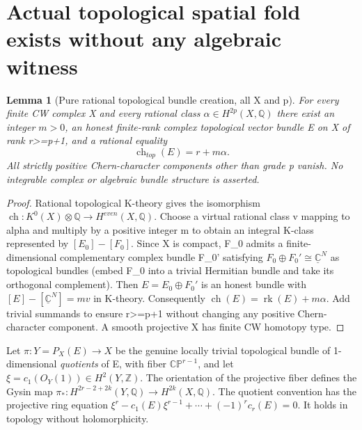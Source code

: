\documentclass[11pt]{article}
\newtheorem{lemma}[theorem]{Lemma}
\begin{document}
\section{Actual topological spatial fold exists without any algebraic witness}
\begin{lemma}[Pure rational topological bundle creation, all X and p]
For every finite CW complex X and every rational class
$\alpha\in H^{2p}(X,\mathbb Q)$ there exist an integer
$m>0$, an honest finite-rank complex \emph{topological}
vector bundle E on X of rank r>=p+1, and a rational equality
\[
 \boxed{\operatorname{ch}_{top}(E)=r+m\alpha.}          \tag{1}
\]
All strictly positive Chern-character components other
than grade p vanish. No integrable complex or algebraic
bundle structure is asserted.
\end{lemma}
\begin{proof}
Rational topological K-theory gives the isomorphism
$\operatorname{ch}:K^0(X)\otimes\mathbb Q
 \longrightarrow H^{even}(X,\mathbb Q)$.
Choose a virtual rational class v mapping to alpha and
multiply by a positive integer m to obtain an integral
K-class represented by $[E_0]-[F_0]$.
Since X is compact, F_0 admits a finite-dimensional
complementary complex bundle F_0' satisfying
$F_0\oplus F_0'\cong\underline{\mathbb C}^{N}$
as topological bundles (embed F_0 into a trivial Hermitian
bundle and take its orthogonal complement).
Then $E=E_0\oplus F_0'$ is an honest bundle with
$[E]-[\underline{\mathbb C}^{N}]=m v$ in K-theory.
Consequently $\operatorname{ch}(E)=\operatorname{rk}(E)+m\alpha$.
Add trivial summands to ensure r>=p+1 without changing
any positive Chern-character component.
A smooth projective X has finite CW homotopy type.
\end{proof}

Let $\pi:Y=P_X(E)\to X$ be the genuine locally trivial
topological bundle of 1-dimensional \emph{quotients} of E,
with fiber $\mathbb{CP}^{r-1}$, and let
$\xi=c_1(O_Y(1))\in H^2(Y,\mathbb Z)$.
The orientation of the projective fiber defines the
Gysin map $\pi_*:H^{2r-2+2k}(Y,\mathbb Q)
   \longrightarrow H^{2k}(X,\mathbb Q)$.
The quotient convention has the projective ring equation
$\xi^r-c_1(E)\xi^{r-1}+\cdots+(-1)^r c_r(E)=0$.
It holds in topology without holomorphicity.
\end{document}
